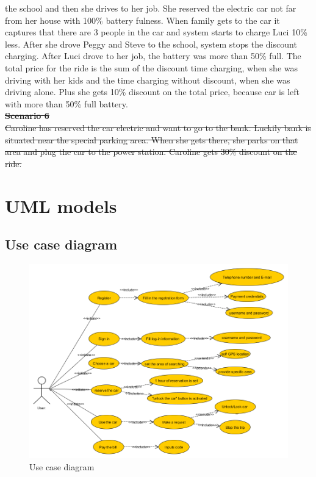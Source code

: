 \documentclass[12pt, letterpaper]{article}
\begin{document}
the school and then she drives to her job. She reserved the electric car not far from her
house with 100\% battery fulness. When family gets to the car it captures that there are
3 people in the car and system starts to charge Luci 10\% less. After she drove Peggy
and Steve to the school, system stops the discount charging. After Luci drove to her
job, the battery was more than 50\% full. The total price for the ride is the sum of the
discount time charging, when she was driving with her kids and the time charging
without discount, when she was driving alone. Plus she gets 10\% discount on the total
price, because car is left with more than 50\% full battery. \\
\vspace{0.5cm}
\sout{\textbf {Scenario 6}} \\
\vspace{0.5cm}
\sout{Caroline has reserved the car electric and want to go to the bank. Luckily bank is
situated near the special parking area. When she gets there, she parks on that area and
plug the car to the power station. Caroline gets 30\% discount on the ride.}
\newpage

\section{UML models}

\subsection{Use case diagram}

\begin{figure}[H]
\centering
\includegraphics[width=12cm]{Usecase.png}
\caption{Use case diagram}
\label{fig:Usecase}
\end{figure}
\end{document}
